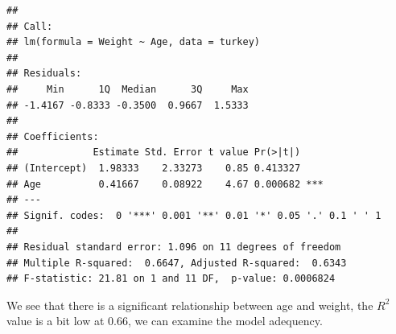 \documentclass[
  11pt,
]{article}
\begin{document}
\begin{verbatim}
## 
## Call:
## lm(formula = Weight ~ Age, data = turkey)
## 
## Residuals:
##     Min      1Q  Median      3Q     Max 
## -1.4167 -0.8333 -0.3500  0.9667  1.5333 
## 
## Coefficients:
##             Estimate Std. Error t value Pr(>|t|)    
## (Intercept)  1.98333    2.33273    0.85 0.413327    
## Age          0.41667    0.08922    4.67 0.000682 ***
## ---
## Signif. codes:  0 '***' 0.001 '**' 0.01 '*' 0.05 '.' 0.1 ' ' 1
## 
## Residual standard error: 1.096 on 11 degrees of freedom
## Multiple R-squared:  0.6647, Adjusted R-squared:  0.6343 
## F-statistic: 21.81 on 1 and 11 DF,  p-value: 0.0006824
\end{verbatim}

We see that there is a significant relationship between age and weight,
the \(R^2\) value is a bit low at 0.66, we can examine the model
adequency.
\end{document}
